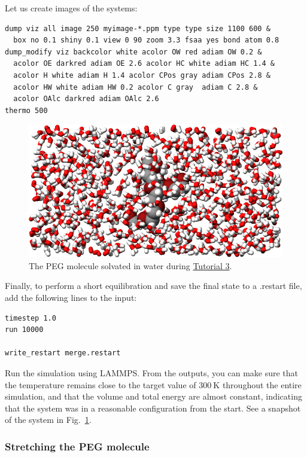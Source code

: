 \documentclass[9pt,tutorial]{livecoms}
\newcommand{\lmpcmd}[1]{\colorbox{listing}{\textcolor{command}{\small{#1}}}} %
\begin{document}
\noindent Let us create images of the systems:
\begin{lstlisting}
dump viz all image 250 myimage-*.ppm type type size 1100 600 &
  box no 0.1 shiny 0.1 view 0 90 zoom 3.3 fsaa yes bond atom 0.8
dump_modify viz backcolor white acolor OW red adiam OW 0.2 &
  acolor OE darkred adiam OE 2.6 acolor HC white adiam HC 1.4 &
  acolor H white adiam H 1.4 acolor CPos gray adiam CPos 2.8 &
  acolor HW white adiam HW 0.2 acolor C gray  adiam C 2.8 &
  acolor OAlc darkred adiam OAlc 2.6
thermo 500
\end{lstlisting}
\begin{figure}
\centering
\includegraphics[width=\linewidth]{PEG-solvated}
\caption{The PEG molecule solvated in water during
\hyperref[all-atom-label]{Tutorial 3}.}
\label{fig:PEG-solvated}
\end{figure}
Finally, to perform a short equilibration and save the final state to
a \lmpcmd{.restart} file, add the following lines to the input:
\begin{lstlisting}
timestep 1.0
run 10000

write_restart merge.restart
\end{lstlisting}
Run the simulation using LAMMPS.  From the outputs, you can make
sure that the temperature remains close to the
target value of $300~\text{K}$ throughout the entire simulation, and that
the volume and total energy are almost constant, indicating
that the system was in a reasonable configuration from the start.
See a snapshot of the system in Fig.~\ref{fig:PEG-solvated}.

\subsubsection{Stretching the PEG molecule}
\end{document}
